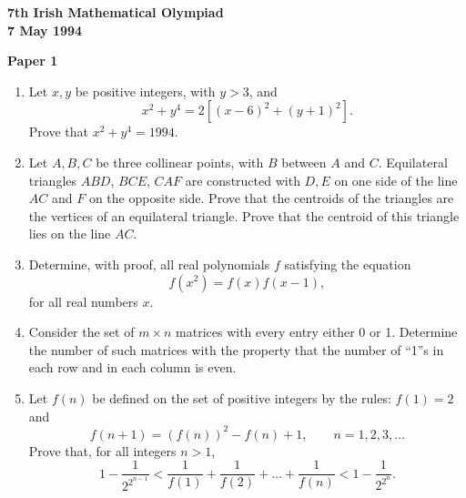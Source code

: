 \documentclass[12pt]{article}
\begin{document}
\begin{center}
{\large\bfseries 7th Irish Mathematical Olympiad\\7 May 1994}
\end{center}
\bigskip\noindent\textbf{Paper 1}\bigskip
\begin{enumerate}
\item Let $x, y$ be positive integers, with $y > 3$, and
\[x^2 + y^4 = 2[(x-6)^2 + (y+1)^2].\]
Prove that $x^2 + y^4 = 1994$.

\item Let $A, B, C$ be three collinear points, with $B$ between $A$ and $C$. Equilateral triangles $ABD$, $BCE$, $CAF$ are constructed with $D, E$ on one side of the line $AC$ and $F$ on the opposite side. Prove that the centroids of the triangles are the vertices of an equilateral triangle. Prove that the centroid of this triangle lies on the line $AC$.

\item Determine, with proof, all real polynomials $f$ satisfying the equation
\[f(x^2) = f(x)f(x-1),\]
for all real numbers $x$.

\item Consider the set of $m \times n$ matrices with every entry either 0 or 1. Determine the number of such matrices with the property that the number of ``1''s in each row and in each column is even.

\item Let $f(n)$ be defined on the set of positive integers by the rules: $f(1) = 2$ and
\[f(n+1) = (f(n))^2 - f(n) + 1, \qquad n = 1, 2, 3, \ldots\]
Prove that, for all integers $n > 1$,
\[1 - \frac{1}{2^{2^{n-1}}} < \frac{1}{f(1)} + \frac{1}{f(2)} + \ldots + \frac{1}{f(n)} < 1 - \frac{1}{2^{2^n}}.\]
\end{enumerate}
\end{document}
